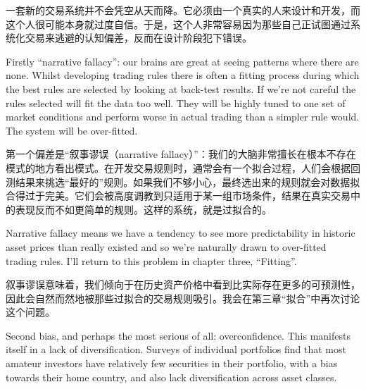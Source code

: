 \begin{chineseblock}一套新的交易系统并不会凭空从天而降。它必须由一个真实的人来设计和开发，而这个人很可能本身就过度自信。于是，这个人非常容易因为那些自己正试图通过系统化交易来逃避的认知偏差，反而在设计阶段犯下错误。\end{chineseblock}

\bipairgap

\begin{englishblock} Firstly ``narrative fallacy'': our brains are great at seeing patterns where there are none. Whilst developing trading rules there is often a fitting process during which the best rules are selected by looking at back-test results. If we're not careful the rules selected will fit the data too well. They will be highly tuned to one set of market conditions and perform worse in actual trading than a simpler rule would. The system will be over-fitted. \end{englishblock}

\begin{chineseblock}第一个偏差是“叙事谬误（narrative fallacy）”：我们的大脑非常擅长在根本不存在模式的地方看出模式。在开发交易规则时，通常会有一个拟合过程，人们会根据回测结果来挑选“最好的”规则。如果我们不够小心，最终选出来的规则就会对数据拟合得过于完美。它们会被高度调教到只适用于某一组市场条件，结果在真实交易中的表现反而不如更简单的规则。这样的系统，就是过拟合的。\end{chineseblock}

\bipairgap

\begin{englishblock} Narrative fallacy means we have a tendency to see more predictability in historic asset prices than really existed and so we're naturally drawn to over-fitted trading rules. I'll return to this problem in chapter three, ``Fitting''. \end{englishblock}

\begin{chineseblock}叙事谬误意味着，我们倾向于在历史资产价格中看到比实际存在更多的可预测性，因此会自然而然地被那些过拟合的交易规则吸引。我会在第三章“拟合”中再次讨论这个问题。\end{chineseblock}

\bipairgap

\begin{englishblock} Second bias, and perhaps the most serious of all: overconfidence. This manifests itself in a lack of diversification. Surveys of individual portfolios find that most amateur investors have relatively few securities in their portfolio, with a bias towards their home country, and also lack diversification across asset classes. \end{englishblock}

